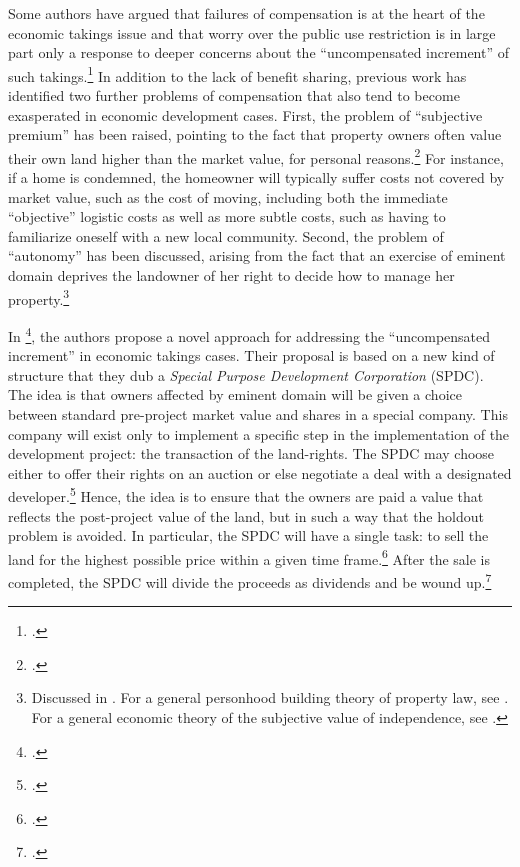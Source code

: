Some authors have argued that failures of compensation is at the heart of the economic takings issue and that worry over the public use restriction is in large part only a response to deeper concerns about the ``uncompensated increment'' of such takings.\footcite[See][962]{fennell04} In addition to the lack of benefit sharing, previous work has identified two further problems of compensation that also tend to become exasperated in economic development cases. First, the problem of ``subjective premium'' has been raised, pointing to the fact that property owners often value their own land higher than the market value, for personal reasons.\footcite[963]{fennell04} For instance, if a home is condemned, the homeowner will typically suffer costs not covered by market value, such as the cost of moving, including both the immediate ``objective'' logistic costs as well as more subtle costs, such as having to familiarize oneself with a new local community. Second, the problem of ``autonomy'' has been discussed, arising from the fact that an exercise of eminent domain deprives the landowner of her right to decide how to manage her property.\footnote{Discussed in \cite[966-967]{fennell04}. For a general personhood building theory of property law, see \cite{radin93}. For a general economic theory of the subjective value of independence, see \cite{benz08}.}

In \footcite{lehavi07}, the authors propose a novel approach for addressing the ``uncompensated increment'' in economic takings cases. Their proposal is based on a new kind of structure that they dub a {\it Special Purpose Development Corporation} (SPDC). The idea is that owners affected by eminent domain will be given a choice between standard pre-project market value and shares in a special company. This company will exist only to implement a specific step in the implementation of the development project: the transaction of the land-rights. The SPDC may choose either to offer their rights on an auction or else negotiate a deal with a designated developer.\footcite[1735]{lehavi07} Hence, the idea is to ensure that the owners are paid a value that reflects the post-project value of the land, but in such a way that the holdout problem is avoided. In particular, the SPDC will have a single task: to sell the land for the highest possible price within a given time frame.\footcite[1741]{lehavi07} After the sale is completed, the SPDC will divide the proceeds as dividends and be wound up.\footcite[1741]{lehavi07}

